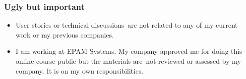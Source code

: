 \begin{frame}[c]
\begin{figure}[ht]
	\end{figure}
\end{frame}





\begin{frame}
\frametitle{Ugly but important}

\begin{itemize}[<+->]
	\item User stories or technical discussions are not related to any of my current work or my previous companies.
	\item I am working at EPAM Systems. My company approved me for doing this online course public but the materials are not reviewed or assessed by my company. It is on my own responsibilities.
\end{itemize}
\end{frame}

%	

